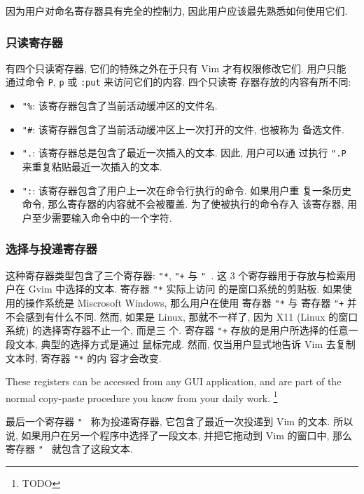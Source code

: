 因为用户对命名寄存器具有完全的控制力, 因此用户应该最先熟悉如何使用它们.

\subsubsection{只读寄存器}
\label{subsubsec:the_read_only_registers}

有四个只读寄存器, 它们的特殊之外在于只有 Vim 才有权限修改它们. 用户只能
通过命令 \texttt{P}, \texttt{p} 或 \texttt{:put} 来访问它们的内容. 四个只读寄
存器存放的内容有所不同:
\begin{itemize}
    \item \texttt{"\%}: 该寄存器包含了当前活动缓冲区的文件名.
    \item \texttt{"\#}: 该寄存器包含了当前活动缓冲区上一次打开的文件, 也被称为
        备选文件.
    \item \texttt{".}: 该寄存器总是包含了最近一次插入的文本. 因此, 用户可以通
        过执行 \texttt{".P} 来重复粘贴最近一次插入的文本.
    \item \texttt{":}: 该寄存器包含了用户上一次在命令行执行的命令. 如果用户重
        复一条历史命令, 那么寄存器的内容就不会被覆盖. 为了使被执行的命令存入
        该寄存器, 用户至少需要输入命令中的一个字符.
\end{itemize}

\subsubsection{选择与投递寄存器}
\label{subsubsec:the_selection_and_drop_registers}

这种寄存器类型包含了三个寄存器: \texttt{"*}, \texttt{"+} 与 \texttt{"~}. 这 3
个寄存器用于存放与检索用户在 Gvim 中选择的文本. 寄存器 \texttt{"*} 实际上访问
的是窗口系统的剪贴板. 如果使用的操作系统是 Miscrosoft Windows, 那么用户在使用
寄存器 \texttt{"*} 与 寄存器 \texttt{"+} 并不会感到有什么不同. 然而, 如果是
Linux, 那就不一样了, 因为 X11 (Linux 的窗口系统) 的选择寄存器不止一个, 而是三
个. 寄存器 \texttt{"+} 存放的是用户所选择的任意一段文本, 典型的选择方式是通过
鼠标完成. 然而, 仅当用户显式地告诉 Vim 去复制文本时, 寄存器 \texttt{"*} 的内
容才会改变.

These registers can be accessed from any GUI application, and are part of the
normal copy-paste procedure you know from your daily work.
\footnote{TODO}

最后一个寄存器 \texttt{"~} 称为投递寄存器, 它包含了最近一次投递到 Vim 的文本.
所以说, 如果用户在另一个程序中选择了一段文本, 并把它拖动到 Vim 的窗口中, 那么
寄存器 \texttt{"~} 就包含了这段文本.

